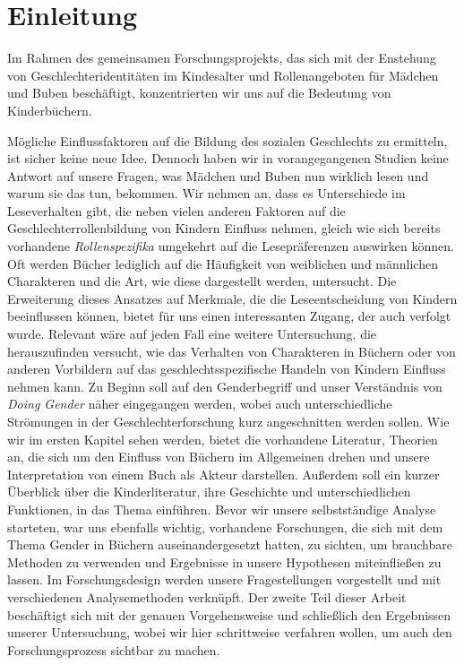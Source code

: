 \onehalfspace

\chapter{Einleitung}

Im Rahmen des gemeinsamen Forschungsprojekts, das sich mit der Enstehung
von Geschlechteridentitäten im Kindesalter und Rollenangeboten für
Mädchen und Buben beschäftigt, konzentrierten wir uns auf die Bedeutung
von Kinderbüchern.

Mögliche Einflussfaktoren auf die Bildung des sozialen Geschlechts zu
ermitteln, ist sicher keine neue Idee. Dennoch haben wir in
vorangegangenen Studien keine Antwort auf unsere Fragen, was Mädchen und
Buben nun wirklich lesen und warum sie das tun, bekommen. Wir nehmen an,
dass es Unterschiede im Leseverhalten gibt, die neben vielen anderen
Faktoren auf die Geschlechterrollenbildung von Kindern Einfluss nehmen,
gleich wie sich bereits vorhandene \emph{Rollenspezifika} umgekehrt auf
die Lesepräferenzen auswirken können. Oft werden Bücher lediglich auf
die Häufigkeit von weiblichen und männlichen Charakteren und die Art,
wie diese dargestellt werden, untersucht. Die Erweiterung dieses
Ansatzes auf Merkmale, die die Leseentscheidung von Kindern beeinflussen
können, bietet für uns einen interessanten Zugang, der auch verfolgt
wurde. Relevant wäre auf jeden Fall eine weitere Untersuchung, die
herauszufinden versucht, wie das Verhalten von Charakteren in Büchern
oder von anderen Vorbildern auf das geschlechtsspezifische Handeln von
Kindern Einfluss nehmen kann. Zu Beginn soll auf den Genderbegriff und
unser Verständnis von \emph{Doing Gender} näher eingegangen werden,
wobei auch unterschiedliche Strömungen in der Geschlechterforschung kurz
angeschnitten werden sollen. Wie wir im ersten Kapitel sehen werden,
bietet die vorhandene Literatur, Theorien an, die sich um den Einfluss
von Büchern im Allgemeinen drehen und unsere Interpretation von einem
Buch als Akteur darstellen. Außerdem soll ein kurzer Überblick über die
Kinderliteratur, ihre Geschichte und unterschiedlichen Funktionen, in
das Thema einführen. Bevor wir unsere selbstständige Analyse starteten,
war uns ebenfalls wichtig, vorhandene Forschungen, die sich mit dem
Thema Gender in Büchern auseinandergesetzt hatten, zu sichten, um
brauchbare Methoden zu verwenden und Ergebnisse in unsere Hypothesen
miteinfließen zu lassen. Im Forschungsdesign werden unsere
Fragestellungen vorgestellt und mit verschiedenen Analysemethoden
verknüpft. Der zweite Teil dieser Arbeit beschäftigt sich mit der
genauen Vorgehensweise und schließlich den Ergebnissen unserer
Untersuchung, wobei wir hier schrittweise verfahren wollen, um auch den
Forschungsprozess sichtbar zu machen.
